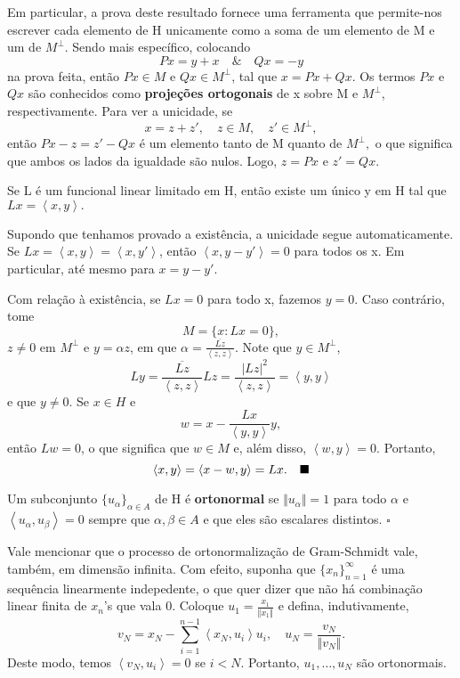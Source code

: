 \documentclass[measure_theory.tex]{subfiles}
\begin{document}
Em particular, a prova deste resultado fornece uma ferramenta que permite-nos escrever cada elemento de H unicamente como a soma de um elemento de M e um de \(M^{\perp }\). Sendo mais específico, colocando
\[
	Px = y + x\quad\&\quad Qx = -y
\]
na prova feita, então \(Px\in M\) e \(Qx\in M^{\perp }\), tal que \(x = Px + Qx\). Os termos \(Px\) e \(Qx\) são conhecidos como \textbf{projeções ortogonais} de x sobre M e \(M^{\perp }\), respectivamente. Para ver a unicidade, se
\[
	x = z + z',\quad z\in M,\quad z'\in M^{\perp },
\]
então \(Px - z = z' - Qx\) é um elemento tanto de M quanto de \(M^{\perp },\) o que significa que ambos os lados da igualdade são nulos. Logo, \(z = Px\) e \(z'=Qx.\)
\begin{theorem*}
	Se L é um funcional linear limitado em H, então existe um único y em H tal que \(Lx = \left< x, y \right>.\)
\end{theorem*}
\begin{proof*}
	Supondo que tenhamos provado a existência, a unicidade segue automaticamente. Se \(Lx = \left< x, y \right> = \left< x, y' \right>\), então \(\left< x, y - y' \right> = 0\) para todos os x. Em particular, até mesmo para
	\(x = y - y'.\)

	Com relação à existência, se \(Lx = 0\) para todo x, fazemos \(y = 0\). Caso contrário, tome
	\[
		M = \{x: Lx = 0\},
	\]
	\(z\neq 0\) em \(M^{\perp }\) e \(y = \alpha z\), em que \(\alpha  = \frac{\overline{Lz}}{\left< z, z \right>}.\) Note que \(y\in M^{\perp }\),
	\[
		Ly = \frac{\overline{Lz}}{\left< z, z \right>}Lz = \frac{|Lz|^{2}}{\left< z, z \right>} = \left< y, y \right>
	\]
	e que \(y\neq 0.\) Se \(x\in H\) e
	\[
		w = x - \frac{Lx}{\left< y, y \right>}y,
	\]
	então \(Lw = 0\), o que significa que \(w\in M\) e, além disso, \(\left< w, y \right> = 0\). Portanto,
	\[
		\left< x, y \right> = \left< x - w, y \right> = Lx. \quad \text{$\blacksquare$}
	\]
\end{proof*}
\begin{def*}
	Um subconjunto \(\{u_{\alpha }\}_{\alpha \in A}\) de H é \textbf{ortonormal} se \(\Vert u_{\alpha } \Vert = 1\) para todo \(\alpha \) e \(\left< u_{\alpha }, u_{\beta } \right> = 0\) sempre que \(\alpha , \beta \in A\) e que eles são escalares distintos. \(\square\)
\end{def*}
Vale mencionar que o processo de ortonormalização de Gram-Schmidt vale, também, em dimensão infinita. Com efeito, suponha que \(\{x_{n}\}_{n=1}^{\infty}\) é uma sequência linearmente indepedente, o que quer dizer que não há combinação linear finita de \(x_{n}\)'s que vala 0. Coloque
\(u_1 = \frac{x_1}{\Vert x_1 \Vert}\) e defina, indutivamente,
\[
	v_{N} = x_{N} - \sum\limits_{i=1}^{n-1}\left< x_{N}, u_{i} \right>u_{i},\quad u_{N} = \frac{v_{N}}{\Vert v_{N} \Vert}.
\]
Deste modo, temos \(\left< v_{N}, u_{i} \right> = 0\) se \(i < N\). Portanto, \(u_1, \dotsc , u_{N}\) são ortonormais.
\end{document}
